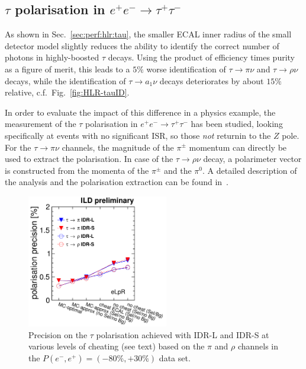 \subsection{\texorpdfstring{$\tau$}{Tau} polarisation \texorpdfstring{in $e^+e^- \to \tau^+\tau^-$}{in e+e- -> tau tau}}

As shown in Sec.~\ref{sec:perf:hlr:tau}, the smaller ECAL inner radius of the small detector model slightly reduces the ability to identify the correct number of photons in
highly-boosted $\tau$ decays. Using the product of efficiency times purity as a figure of merit, this leads to a $5\%$ worse identification of $\tau \to \pi \nu$ and $\tau \to \rho \nu$ decays, while the identification of $\tau \to a_1 \nu$ decays deteriorates by about $15\%$ relative, c.f.\ Fig.~\ref{fig:HLR-tauID}. 

In order to evaluate the impact of this difference in a physics example, the measurement of the $\tau$ polarisation in $e^+e^- \to \tau^+\tau^-$ has been studied, looking specifically at events with no significant ISR, so those {\em not} returnin to the $Z$ pole. For the $\tau \to \pi \nu$ channels, the magnitude of the $\pi^{\pm}$ momentum can directly be used to extract the polarisation. In case of the $\tau \to \rho \nu$ decay, a polarimeter vector is constructed from the momenta of the $\pi^{\pm}$ and the $\pi^0$. A detailed description of the analysis and the polarisation extraction can be found in~\cite{ILDNote:tautau}.

\begin{figure}[htbp]
\begin{center}
 \includegraphics[width=0.55\textwidth]{Performance/fig/drawpexpresults0-update.pdf}
\end{center}
\caption{Precision on the $\tau$ polarisation achieved with IDR-L and IDR-S at various levels of cheating (see text) based on the $\pi$ and $\rho$ channels in the $P(e^-,e^+)=(-80\%,+30\%)$ data set.}
\label{fig:tautau:taupol}
\end{figure}

